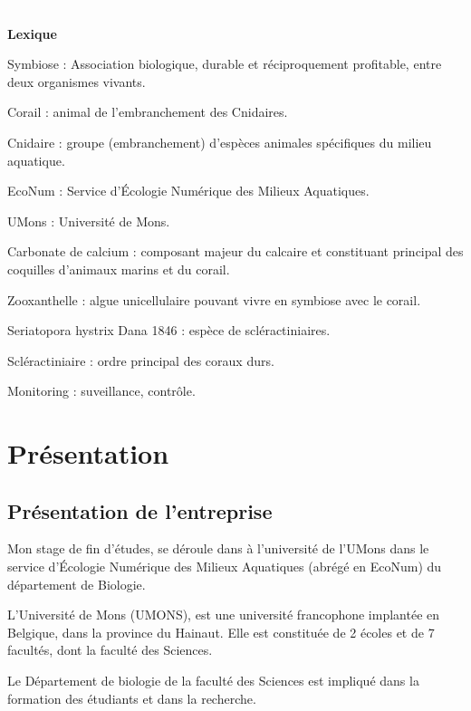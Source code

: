 \documentclass[]{report}
\begin{document}
\null
\newpage

\tableofcontents

\null
\newpage

\textcolor{white}{.}

\Huge 
{\bf Lexique} \vspace{1 cm}

\normalsize

Symbiose : Association biologique, durable et réciproquement profitable,
entre deux organismes vivants.

Corail : animal de l'embranchement des Cnidaires.

Cnidaire : groupe (embranchement) d'espèces animales spécifiques du
milieu aquatique.

EcoNum : Service d'Écologie Numérique des Milieux Aquatiques.

UMons : Université de Mons.

Carbonate de calcium : composant majeur du calcaire et constituant
principal des coquilles d'animaux marins et du corail.

Zooxanthelle : algue unicellulaire pouvant vivre en symbiose avec le
corail.

Seriatopora hystrix Dana 1846 : espèce de scléractiniaires.

Scléractiniaire : ordre principal des coraux durs.

Monitoring : suveillance, contrôle.

\null
\newpage

\chapter{Présentation}\label{presentation}

\section{Présentation de
l'entreprise}\label{presentation-de-lentreprise}

Mon stage de fin d'études, se déroule dans à l'université de l'UMons
dans le service d'Écologie Numérique des Milieux Aquatiques (abrégé en
EcoNum) du département de Biologie.

L'Université de Mons (UMONS), est une université francophone implantée
en Belgique, dans la province du Hainaut. Elle est constituée de 2
écoles et de 7 facultés, dont la faculté des Sciences.

Le Département de biologie de la faculté des Sciences est impliqué dans
la formation des étudiants et dans la recherche.
\end{document}
